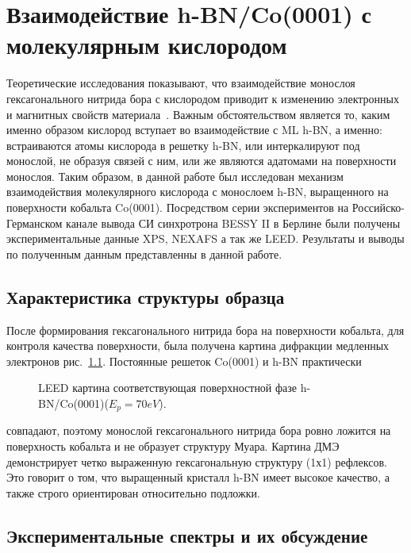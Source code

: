 \chapter{Взаимодействие h-BN/Co(0001) с молекулярным кислородом} \label{chapt3}

Теоретические исследования показывают, что взаимодействие монослоя гексагонального 
нитрида бора с кислородом приводит к изменению электронных и магнитных
свойств материала~\cite{Ataca2010,Zhou2010}. Важным обстоятельством является то, каким именно образом кислород
вступает во взаимодействие с ML h-BN, а именно: встраиваются атомы кислорода в решетку 
h-BN, или интеркалируют под монослой, не образуя связей с ним, или же являются 
адатомами на поверхности монослоя. Таким образом, в данной работе был 
исследован механизм взаимодействия молекулярного кислорода с монослоем h-BN, выращенного на 
поверхности кобальта Co(0001). Посредством серии экспериментов на Российско-Германском
канале вывода СИ синхротрона BESSY II в Берлине были получены экспериментальные 
данные XPS, NEXAFS а так же LEED. Результаты и выводы по полученным данным 
представленны в данной работе.

\section{Характеристика структуры образца}

После формирования гексагонального нитрида бора на поверхности кобальта, для контроля
качества  поверхности, была получена картина дифракции медленных электронов
рис.~\ref{pic:LEED}. Постоянные решеток Co(0001) и h-BN практически  
\begin{figure}[!ht]
\caption{LEED картина соответствующая поверхностной фазе h-BN/Co(0001)($E_p = 70 eV$).}
\label{pic:LEED}
\end{figure}
совпадают, поэтому монослой гексагонального нитрида бора ровно ложится на поверхность
кобальта и не образует структуру Муара.
Картина ДМЭ демонстрирует четко выраженную гексагональную структуру (1х1) рефлексов.
Это говорит о том, что выращенный кристалл h-BN имеет высокое качество, а также строго 
ориентирован относительно подложки.

\section{Экспериментальные спектры и их обсуждение}

